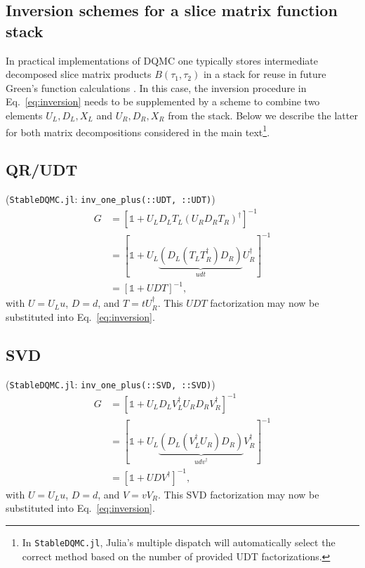 \documentclass[submission, Phys]{SciPost}
\begin{document}
\begin{appendix}

\section{Inversion schemes for a slice matrix function stack}

In practical implementations of DQMC one typically stores intermediate decomposed slice matrix products $B(\tau_1, \tau_2)$ in a stack for reuse in future Green's function calculations \cite{Assaad2002a, Santos2003, Broecker2016}. In this case, the inversion procedure in Eq.~\eqref{eq:inversion} needs to be supplemented by a scheme to combine two elements $U_L, D_L, X_L$ and $U_R, D_R, X_R$ from the stack. Below we describe the latter for both matrix decompositions considered in the main text\footnote{In \texttt{StableDQMC.jl}, Julia's multiple dispatch will automatically select the correct method based on the number of provided UDT factorizations.}.

\subsection{QR/UDT}

(\texttt{StableDQMC.jl}: \texttt{inv\_one\_plus(::UDT, ::UDT)})
\begin{align}
	G &= \left[\mathbb{1} + U_L D_L T_L \left( U_R D_R T_R \right)^\dagger \right]^{-1}\nonumber \\
	&= \left[\mathbb{1} + U_L \underbrace{\left( D_L \left( T_L T_R^\dagger \right) D_R \right)}_{udt} U_R^\dagger \right]^{-1} \\
	&= \left[\mathbb{1} + U D T \right]^{-1},\nonumber
\end{align}
with $U=U_Lu$, $D=d$, and $T=tU_R^\dagger$. This $UDT$ factorization may now be substituted into Eq.~\eqref{eq:inversion}.


\subsection{SVD}

(\texttt{StableDQMC.jl}: \texttt{inv\_one\_plus(::SVD, ::SVD)})
\begin{align}
G &= \left[\mathbb{1} + U_L D_L V_L^\dagger U_R D_R V_R^\dagger \right]^{-1} \nonumber \\
&= \left[\mathbb{1} + U_L \underbrace{\left( D_L \left( V_L^\dagger U_R \right) D_R \right)}_{udv^\dagger} V_R^\dagger \right]^{-1} \\
&= \left[\mathbb{1} + U D V^\dagger \right]^{-1},\nonumber
\end{align}
with $U=U_Lu$, $D=d$, and $V=v V_R$. This SVD factorization may now be substituted into Eq.~\eqref{eq:inversion}.

	
\end{appendix}
\end{document}
